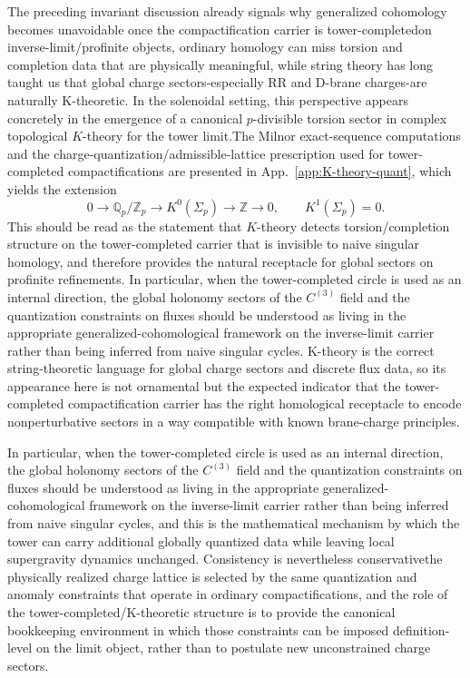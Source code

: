 \documentclass[11pt]{article}
\theoremstyle{remark}
\newcommand{\Z}{\mathbb{Z}}
\newcommand{\Q}{\mathbb{Q}}
\begin{document}
The preceding invariant discussion already signals why generalized cohomology becomes unavoidable once the compactification carrier is tower-completed\:on inverse-limit/profinite objects, ordinary homology can miss torsion and completion data that are physically meaningful, while string theory has long taught us that global charge sectors-especially RR and D-brane charges-are naturally K-theoretic.
In the solenoidal setting, this perspective appears concretely in the emergence of a canonical
$p$-divisible torsion sector in complex topological $K$-theory for the tower limit.The Milnor exact-sequence computations and the charge-quantization/admissible-lattice prescription used for tower-completed compactifications are presented in App.~\ref{app:K-theory-quant}, which yields the extension
\begin{equation}\label{eq:K0Sigma-extension}
0 \longrightarrow \Q_p/\Z_p \longrightarrow K^0(\Sigma_p)\longrightarrow \Z \longrightarrow 0,
\qquad
K^1(\Sigma_p)=0 .
\end{equation}
This should be read as the statement that $K$-theory detects torsion/completion structure on the
tower-completed carrier that is invisible to naive singular homology, and therefore provides the
natural receptacle for global sectors on profinite refinements. In particular, when the tower-completed
circle is used as an internal direction, the global holonomy sectors of the $C^{(3)}$ field and the
quantization constraints on fluxes should be understood as living in the appropriate generalized-cohomological
framework on the inverse-limit carrier rather than being inferred from naive singular cycles.
 K-theory is the correct string-theoretic language for global charge sectors and discrete flux data, so its appearance here is not ornamental but the expected indicator that the tower-completed compactification carrier has the right homological receptacle to encode nonperturbative sectors in a way compatible with known brane-charge principles. 
 
 In particular, when the tower-completed circle is used as an internal direction, the global holonomy sectors of the \(C^{(3)}\) field and the quantization constraints on fluxes should be understood as living in the appropriate generalized-cohomological framework on the inverse-limit carrier rather than being inferred from naive singular cycles, and this is the mathematical mechanism by which the tower can carry additional globally quantized data while leaving local supergravity dynamics unchanged. Consistency is nevertheless conservative\:the physically realized charge lattice is selected by the same quantization and anomaly constraints that operate in ordinary compactifications, and the role of the tower-completed/K-theoretic structure is to provide the canonical bookkeeping environment in which those constraints can be imposed definition-level on the limit object, rather than to postulate new unconstrained charge sectors.
\end{document}
